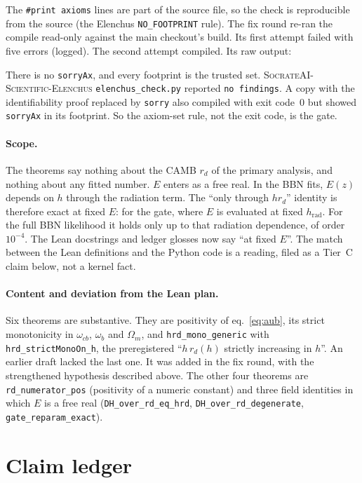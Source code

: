 \documentclass[11pt]{article}
\begin{document}
The \texttt{\#print axioms} lines are part of the source file, so the check
is reproducible from the source (the Elenchus \texttt{NO\_FOOTPRINT} rule).
The fix round re-ran the compile read-only against the main checkout's
build. Its first attempt failed with five errors (logged). The second
attempt compiled. Its raw output:

There is no \texttt{sorryAx}, and every footprint is the trusted set.
\textsc{SocrateAI-Scientific-Elenchus} \texttt{elenchus\_check.py} reported
\texttt{no findings}. A copy with the identifiability proof replaced by
\texttt{sorry} also compiled with exit code~0 but showed \texttt{sorryAx}
in its footprint. So the axiom-set rule, not the exit code, is the gate.

\paragraph{Scope.}
The theorems say nothing about the CAMB $r_d$ of the primary analysis, and
nothing about any fitted number. $E$ enters as a free real. In the BBN fits,
$E(z)$ depends on $h$ through the radiation term. The ``only through
$h r_d$'' identity is therefore exact at fixed $E$: for the gate, where
$E$ is evaluated at fixed $h_\mathrm{rad}$. For the full BBN likelihood it
holds only up to that radiation dependence, of order $10^{-4}$. The Lean
docstrings and ledger glosses now say ``at fixed $E$''. The match between the Lean definitions and the Python code is a
reading, filed as a Tier~C claim below, not a kernel fact.

\paragraph{Content and deviation from the Lean plan.}
Six theorems are substantive. They are positivity of eq.~\eqref{eq:aub},
its strict monotonicity in $\omega_{cb}$, $\omega_b$ and $\Omega_m$, and
\texttt{hrd\_mono\_generic} with \texttt{hrd\_strictMonoOn\_h}, the
preregistered ``$h\,r_d(h)$ strictly increasing in $h$''. An earlier draft
lacked the last one. It was added in the fix round, with the strengthened
hypothesis described above. The other four theorems are
\texttt{rd\_numerator\_pos} (positivity of a numeric constant) and three
field identities in which $E$ is a free real (\texttt{DH\_over\_rd\_eq\_hrd},
\texttt{DH\_over\_rd\_degenerate}, \texttt{gate\_reparam\_exact}).

\section{Claim ledger}
\end{document}
